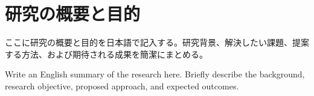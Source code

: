 \documentclass[platex,dvipdfmx,a4j,9pt]{jsarticle}
\date{}
\begin{document}
\maketitle


\section*{研究の概要と目的}
ここに研究の概要と目的を日本語で記入する。研究背景、解決したい課題、提案する方法、および期待される成果を簡潔にまとめる。

\vspace{0.5cm}
Write an English summary of the research here. Briefly describe the background, research objective, proposed approach, and expected outcomes.
\vspace{1cm}
\end{document}
